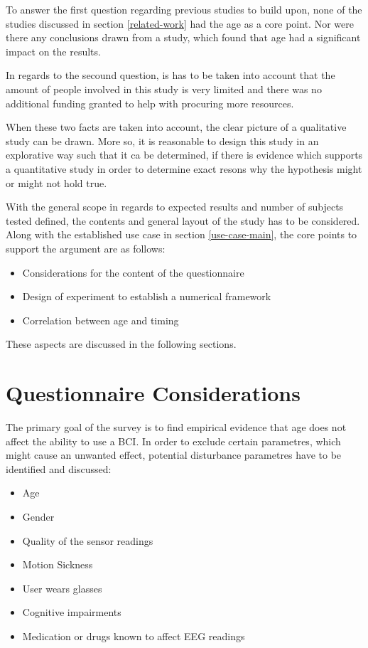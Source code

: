         To answer the first question regarding previous studies to build upon, none of the studies discussed in section \ref*{related-work} had the age as a core point. Nor were there any conclusions drawn from a study, which found that age had a significant impact on the results.

        In regards to the secound question, is has to be taken into account that the amount of people involved in this study is very limited and there was no additional funding granted to help with procuring more resources. 

        When these two facts are taken into account, the clear picture of a qualitative study can be drawn. More so, it is reasonable to design this study in an explorative way such that it ca be determined, if there is evidence which supports a quantitative study in order to determine exact resons why the hypothesis might or might not hold true.

        With the general scope in regards to expected results and number of subjects tested defined, the contents and general layout of the study has to be considered.
        Along with the established use case in section \ref*{use-case-main}, the core points to support the argument are as follows:

         \begin{itemize}
             \item Considerations for the content of the questionnaire
             \item Design of experiment to establish a numerical framework
             \item Correlation between age and timing
         \end{itemize}

         These aspects are discussed in the following sections.        

        \section{Questionnaire Considerations}\label{considerations}

            The primary goal of the survey is to find empirical evidence that age does not affect the ability to use a BCI. In order to exclude certain parametres, which might cause an unwanted effect, potential disturbance parametres have to be identified and discussed:

            \begin{itemize}
                \item Age
                \item Gender
                \item Quality of the sensor readings
                \item Motion Sickness
                \item User wears glasses
                \item Cognitive impairments
                \item Medication or drugs known to affect EEG readings
            \end{itemize}

